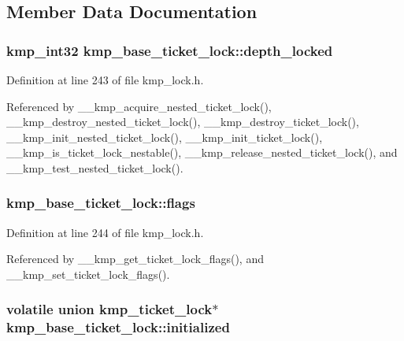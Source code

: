 \subsection{Member Data Documentation}
\hypertarget{structkmp__base__ticket__lock_a647923086ea397dda0c5d9351cb16835}{
\subsubsection[{depth\-\_\-locked}]{\setlength{\rightskip}{0pt plus 5cm}kmp\-\_\-int32 kmp\-\_\-base\-\_\-ticket\-\_\-lock\-::depth\-\_\-locked}}\label{structkmp__base__ticket__lock_a647923086ea397dda0c5d9351cb16835}


Definition at line 243 of file kmp\-\_\-lock.\-h.



Referenced by \-\_\-\-\_\-kmp\-\_\-acquire\-\_\-nested\-\_\-ticket\-\_\-lock(), \-\_\-\-\_\-kmp\-\_\-destroy\-\_\-nested\-\_\-ticket\-\_\-lock(), \-\_\-\-\_\-kmp\-\_\-destroy\-\_\-ticket\-\_\-lock(), \-\_\-\-\_\-kmp\-\_\-init\-\_\-nested\-\_\-ticket\-\_\-lock(), \-\_\-\-\_\-kmp\-\_\-init\-\_\-ticket\-\_\-lock(), \-\_\-\-\_\-kmp\-\_\-is\-\_\-ticket\-\_\-lock\-\_\-nestable(), \-\_\-\-\_\-kmp\-\_\-release\-\_\-nested\-\_\-ticket\-\_\-lock(), and \-\_\-\-\_\-kmp\-\_\-test\-\_\-nested\-\_\-ticket\-\_\-lock().

\hypertarget{structkmp__base__ticket__lock_a2de50496ac13d01017bc079a5bcf09ff}{
\subsubsection[{flags}]{ kmp\-\_\-base\-\_\-ticket\-\_\-lock\-::flags}}\label{structkmp__base__ticket__lock_a2de50496ac13d01017bc079a5bcf09ff}


Definition at line 244 of file kmp\-\_\-lock.\-h.



Referenced by \-\_\-\-\_\-kmp\-\_\-get\-\_\-ticket\-\_\-lock\-\_\-flags(), and \-\_\-\-\_\-kmp\-\_\-set\-\_\-ticket\-\_\-lock\-\_\-flags().

\hypertarget{structkmp__base__ticket__lock_a2dc1ea0be551259b6aa4854628562e0d}{
\subsubsection[{initialized}]{\setlength{\rightskip}{0pt plus 5cm}volatile union {\bf kmp\-\_\-ticket\-\_\-lock}$\ast$ kmp\-\_\-base\-\_\-ticket\-\_\-lock\-::initialized}}\label{structkmp__base__ticket__lock_a2dc1ea0be551259b6aa4854628562e0d}


